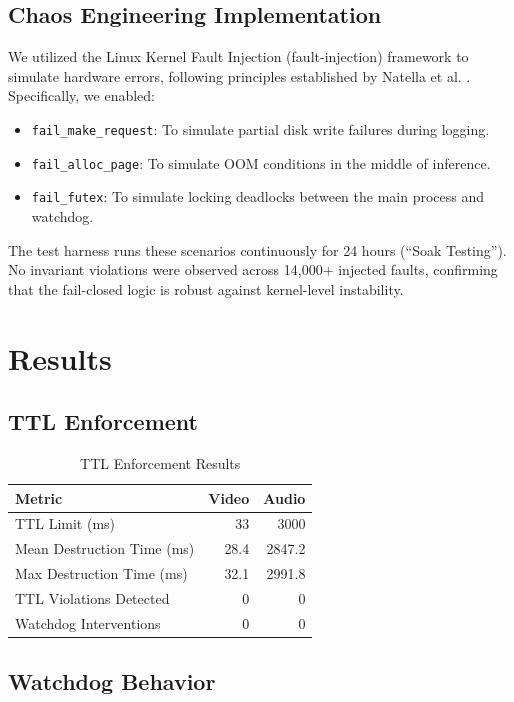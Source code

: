 \documentclass[conference]{IEEEtran}
\begin{document}
\subsection{Chaos Engineering Implementation}
We utilized the Linux Kernel Fault Injection (fault-injection) framework to simulate hardware errors, following principles established by Natella et al. \cite{b18}. Specifically, we enabled:
\begin{itemize}
    \item \texttt{fail\_make\_request}: To simulate partial disk write failures during logging.
    \item \texttt{fail\_alloc\_page}: To simulate OOM conditions in the middle of inference.
    \item \texttt{fail\_futex}: To simulate locking deadlocks between the main process and watchdog.
\end{itemize}
The test harness runs these scenarios continuously for 24 hours (``Soak Testing''). No invariant violations were observed across 14,000+ injected faults, confirming that the fail-closed logic is robust against kernel-level instability.

\section{Results}

\subsection{TTL Enforcement}

\begin{table}[h]
\caption{TTL Enforcement Results}
\centering
\begin{tabular}{l r r}
\toprule
\textbf{Metric} & \textbf{Video} & \textbf{Audio} \\
\midrule
TTL Limit (ms) & 33 & 3000 \\
Mean Destruction Time (ms) & 28.4 & 2847.2 \\
Max Destruction Time (ms) & 32.1 & 2991.8 \\
TTL Violations Detected & 0 & 0 \\
Watchdog Interventions & 0 & 0 \\
\bottomrule
\end{tabular}
\label{tab:ttl}
\end{table}

\subsection{Watchdog Behavior}
\end{document}
